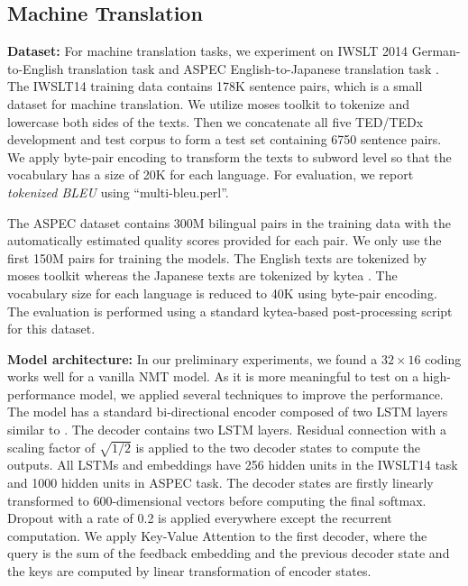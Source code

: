 \documentclass{article} %
\begin{document}
\subsection{Machine Translation}

{\bf Dataset:} \: For machine translation tasks, we experiment on IWSLT 2014 German-to-English translation task \citep{cettolo2014report} and ASPEC English-to-Japanese translation task \citep{NAKAZAWA16.621}. The IWSLT14 training data contains 178K sentence pairs, which is a small dataset for machine translation. We utilize moses toolkit \citep{Koehn2007MosesOS} to tokenize and lowercase both sides of the texts. Then we concatenate all five TED/TEDx development and test corpus to form a test set containing 6750 sentence pairs. We apply byte-pair encoding \citep{Sennrich2016NeuralMT} to transform the texts to subword level so that the vocabulary has a size of 20K for each language. For evaluation, we report {\it tokenized BLEU} using ``multi-bleu.perl''.

The ASPEC dataset contains 300M bilingual pairs in the training data with the automatically estimated quality scores provided for each pair. We only use the first 150M pairs for training the models. The English texts are tokenized by moses toolkit whereas the Japanese texts are tokenized by kytea \citep{kytea}. The vocabulary size for each language is reduced to 40K using byte-pair encoding. The evaluation is performed using a standard kytea-based post-processing script for this dataset.


{\bf Model architecture:} \: In our preliminary experiments, we found a $32 \times 16$ coding works well for a vanilla NMT model. As it is more meaningful to test on a high-performance model, we applied several techniques to improve the performance. The model has a standard bi-directional encoder composed of two LSTM layers similar to \citet{bahdanau2014neural}. The decoder contains two LSTM layers. Residual connection \citep{He2016DeepRL} with a scaling factor of $\sqrt{1/2}$ is applied to the two decoder states to compute the outputs. All LSTMs and embeddings have 256 hidden units in the IWSLT14 task and 1000 hidden units in ASPEC task. The decoder states are firstly linearly transformed to 600-dimensional vectors before computing the final softmax. Dropout with a rate of 0.2 is applied everywhere except the recurrent computation. We apply Key-Value Attention \citep{Miller2016KeyValueMN} to the first decoder, where the query is the sum of the feedback embedding and the previous decoder state and the keys are computed by linear transformation of encoder states.
\end{document}
